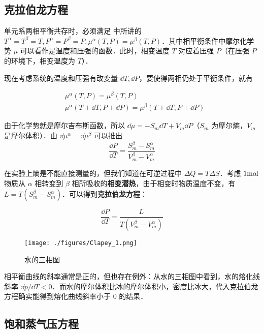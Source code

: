 
\begin{issues}
\issueDraft
\end{issues}


\subsection{克拉伯龙方程}
单元系两相平衡共存时，必须满足 中所讲的 $T^\alpha=T^\beta=T,P^\alpha=P^\beta=P,\mu^\alpha(T,P)=\mu^\beta(T,P)$．其中相平衡条件中摩尔化学势 $\mu$ 可以看作是温度和压强的函数．此时，相变温度 $T$ 对应着压强 $P$（在压强 $P$ 的环境下，相变温度为 $T$）．

现在考虑系统的温度和压强有改变量 $\dd T,\dd P$，要使得两相仍处于平衡条件，就有

\begin{align}
&\mu^\alpha(T,P)=\mu^\beta(T,P)\\
&\mu^\alpha(T+\dd T,P+\dd P)=\mu^\beta(T+\dd T,P+\dd P)
\end{align}

由于化学势就是摩尔吉布斯函数，所以 $\dd\mu=-S_m\dd T+V_m\dd P$（$S_m$ 为摩尔熵，$V_m$ 是摩尔体积）．由 $\dd \mu^\alpha=\dd \mu^\beta$ 可以推出
\begin{equation}
\frac{\dd P}{\dd T}=\frac{S^\beta_m-S^\alpha_m}{V^\beta_m-V^\alpha_m}
\end{equation}

在实验上熵是不能直接测量的，但我们知道在可逆过程中 $\Delta Q=T\Delta S$．考虑 $1\rm mol$ 物质从 $\alpha$ 相转变到 $\beta$ 相所吸收的\textbf{相变潜热}，由于相变时物质温度不变，有 $L=T(S_m^\beta-S_m^\alpha)$．可以得到\textbf{克拉伯龙方程}：

\begin{equation}\label{Clapey_eq1}
\frac{\dd P}{\dd T}=\frac{L}{T(V^\beta_m-V^\alpha_m)}
\end{equation}
\begin{figure}[ht]
\centering
\texttt{[image: ./figures/Clapey\_1.png]}
\caption{水的三相图} \label{Clapey_fig1}
\end{figure}

相平衡曲线的斜率通常是正的，但也存在例外：从水的三相图中看到，水的熔化线斜率 $\dd p/\dd T<0$．而水的摩尔体积比冰的摩尔体积小，密度比冰大，代入克拉伯龙方程确实能得到熔化曲线斜率小于 $0$ 的结果．

\subsection{饱和蒸气压方程}

